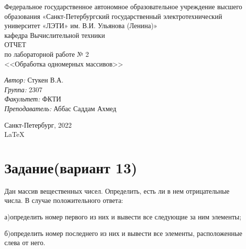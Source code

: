 \documentclass[a4paper,12pt]{report}
\begin{document}
 

\begin{titlepage} 

\begin{center} 

\large Федеральное государственное автономное образовательное учреждение высшего образования «Санкт-Петербургский государственный электротехнический университет «ЛЭТИ» им. В.И. Ульянова (Ленина)»\\
кафедра Вычислительной техники\\[5cm] 

\huge ОТЧЕТ\\ по лабораторной работе № 2\\[0.5cm] 
\large <<Обработка одномерных массивов>>\\[3.7cm]

\begin{minipage}{1\textwidth}
    \begin{flushleft}
        \emph{Автор:} Стукен В.А.\\
        \emph{Группа:} 2307\\
        \emph{Факультет:} ФКТИ\\
        \emph{Преподаватель:} Аббас Саддам Ахмед\\
    \end{flushleft}
\end{minipage}

\vfill

Санкт-Петербург, 2022\\
{\large \LaTeX}

\end{center}
\thispagestyle{empty}
\end{titlepage}

\section*{Задание(вариант 13)}
Дан массив вещественных чисел. Определить, есть ли в нем отрицательные числа. В случае положительного ответа:
\par
а)определить номер первого из них и вывести все следующие за ним элементы;
\par
б)определить номер последнего из них и вывести все элементы, расположенные слева от него.
\end{document}
